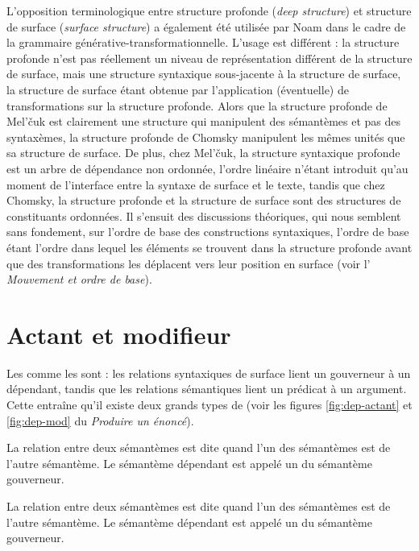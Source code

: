 {L’opposition terminologique entre structure profonde (\textit{deep structure}) et structure de surface (\textit{surface structure}) a également été utilisée par Noam  \cite{chomsky1965aspects} dans le cadre de la grammaire générative-transformationnelle. L’usage est différent : la structure profonde n’est pas réellement un niveau de représentation différent de la structure de surface, mais une structure syntaxique sous-jacente à la structure de surface, la structure de surface étant obtenue par l’application (éventuelle) de transformations sur la structure profonde. Alors que la structure profonde de Mel’čuk est clairement une structure qui manipulent des sémantèmes et pas des syntaxèmes, la structure profonde de Chomsky manipulent les mêmes unités que sa structure de surface. De plus, chez Mel’čuk, la structure syntaxique profonde est un arbre de dépendance non ordonnée, l’ordre linéaire n’étant introduit qu’au moment de l’interface entre la syntaxe de surface et le texte, tandis que chez Chomsky, la structure profonde et la structure de surface sont des structures de constituants ordonnées. Il s’ensuit des discussions théoriques, qui nous semblent sans fondement, sur l’ordre de base des constructions syntaxiques, l’ordre de base étant l’ordre dans lequel les éléments se trouvent dans la structure profonde avant que des transformations les déplacent vers leur position en surface (voir l’ \textit{Mouvement et ordre de base}).}

\section{Actant et modifieur}
Les  comme les  sont  : les relations syntaxiques de surface lient un gouverneur à un dépendant, tandis que les relations sémantiques lient un prédicat à un argument. Cette  entraîne qu’il existe deux grands types de  (voir les figures \ref{fig:dep-actant} et \ref{fig:dep-mod} du  \textit{Produire un énoncé}).

{La relation entre deux sémantèmes est dite  quand l’un des sémantèmes est  de l’autre sémantème. Le sémantème dépendant est appelé un  du sémantème gouverneur.}

{La relation entre deux sémantèmes est dite  quand l’un des sémantèmes est  de l’autre sémantème. Le sémantème dépendant est appelé un  du sémantème gouverneur.}

